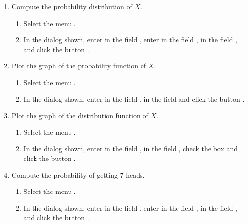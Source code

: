 \begin{enumerate}[leftmargin=*]
\begin{enumerate}
\item Compute the probability distribution of $X$. 
\begin{indication}
\begin{enumerate}
\item Select the menu .
\item In the dialog shown, enter  in the field ,
enter  in the field ,  in the field , and click the button .
\end{enumerate}
\end{indication}

\item Plot the graph of the probability function of $X$.
\begin{indication}
\begin{enumerate}
\item Select the menu .
\item In the dialog shown, enter  in the field ,
 in the field  and click the button .
\end{enumerate}
\end{indication}

\item Plot the graph of the distribution function of $X$.
\begin{indication}
\begin{enumerate}
\item Select the menu .
\item In the dialog shown, enter  in the field ,  in the field
, check the box  and click the button
.
\end{enumerate}
\end{indication}

\item Compute the probability of getting 7 heads.
\begin{indication}
\begin{enumerate}
\item Select the menu .
\item In the dialog shown, enter  in the field ,
enter  in the field ,  in the field , and click the button .
\end{enumerate}
\end{indication}


\end{enumerate}
\end{enumerate}
